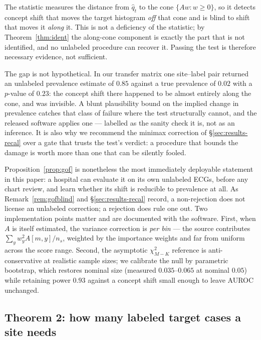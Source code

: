 \begin{remark}\label{rem:gofblind}
The statistic measures the distance from $\hat q_t$ to the cone
$\{Aw : w \ge 0\}$, so it detects concept shift that moves the target
histogram \emph{off} that cone and is blind to shift that moves it
\emph{along} it.  This is not a deficiency of the statistic; by
Theorem~\ref{thm:ident} the along-cone component is exactly the part that is
not identified, and no unlabeled procedure can recover it.  Passing the test is
therefore necessary evidence, not sufficient.

The gap is not hypothetical.  In our transfer matrix one site--label pair
returned an unlabeled prevalence estimate of $0.85$ against a true prevalence of
$0.02$ with a $p$-value of $0.23$: the concept shift there happened to be almost
entirely along the cone, and was invisible.  A blunt plausibility bound on the
implied change in prevalence catches that class of failure where the test
structurally cannot, and the released software applies one --- labelled as the
sanity check it is, not as an inference.  It is also why we recommend the
minimax correction of \S\ref{sec:results-recal} over a gate that trusts the
test's verdict: a procedure that bounds the damage is worth more than one that
can be silently fooled.
\end{remark}

Proposition~\ref{prop:gof} is nonetheless the most immediately deployable
statement in this paper: a hospital can evaluate it on its own unlabeled ECGs, before any chart
review, and learn whether its shift is reducible to prevalence at all.  As
Remark~\ref{rem:gofblind} and \S\ref{sec:results-recal} record, a
non-rejection does not license an unlabeled correction; a rejection does rule
one out.  Two implementation points matter and are documented
with the software.  First, when $A$ is itself estimated, the variance
correction is \emph{per bin} --- the source contributes
$\sum_y w_y^2 A[m,y]/n_s$, weighted by the importance weights and far from
uniform across the score range.  Second, the asymptotic $\chi^2_{M-K}$
reference is anti-conservative at realistic sample sizes; we calibrate the null
by parametric bootstrap, which restores nominal size (measured
$0.035$--$0.065$ at nominal $0.05$) while retaining power $0.93$ against a
concept shift small enough to leave AUROC unchanged.

\subsection{Theorem 2: how many labeled target cases a site needs}

